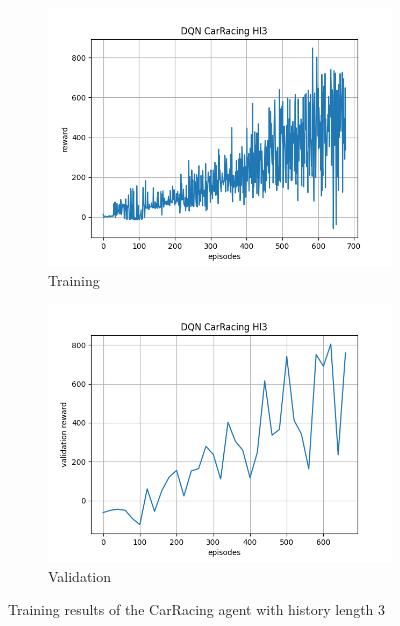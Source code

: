 \documentclass[10pt]{scrartcl}
\begin{document}
\begin{figure}[h]
    \begin{subfigure}{0.5\textwidth}
      \centering
      \includegraphics[width=\linewidth]{images/RL_hl3.png}
      \caption{Training}
      \label{fig:RL_hl3_train}
    \end{subfigure} 
    \begin{subfigure}{0.5\textwidth}
      \centering
      \includegraphics[width=\linewidth]{images/RL_hl3_val.png}
      \caption{Validation}
      \label{fig:RL_hl3_val}
    \end{subfigure}
    \caption{Training results of the CarRacing agent with history length 3}
    \label{fig:Rl_hl3}
\end{figure}
\end{document}
